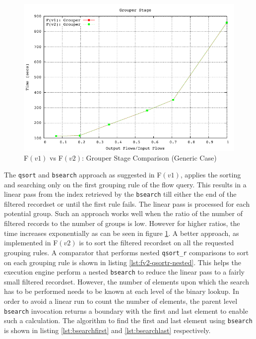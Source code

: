 \begin{figure}[h!]
  \begin{center}
    \includegraphics*
    [width=0.8\linewidth]{figures/benchmarks/grouper-fv1-fv2-bsearch}
    \caption{F$(v1)$ vs F$(v2)$: Grouper Stage Comparison (Generic Case)}
    \label{fig:fv1-fv2-grouper-bsearch}
  \end{center}
\end{figure}

The \texttt{qsort} and \texttt{bsearch} approach as suggested in F$(v1)$,
applies the sorting and searching only on the first grouping rule of the flow
query. This results in a linear pass from the index retrieved by the
\texttt{bsearch} till either the end of the filtered recordset or until the
first rule fails. The linear pass is processed for each potential group. Such
an approach works well when  the
ratio of the number of filtered records to the number of groups is low.
However for higher ratios, the time increases exponentially as can be seen in
figure \ref{fig:fv1-fv2-grouper-bsearch}. A better approach, as implemented in
F$(v2)$ is to sort the filtered recordset on all the requested grouping rules.
A comparator that performs nested \texttt{qsort\_r} comparisons to sort on
each grouping rule is shown in listing \ref{lst:fv2-qsortr-nested}. This helps
the execution engine perform a nested \texttt{bsearch} to reduce the linear
pass to a fairly small filtered recordset. However, the number of elements
upon which the search has to be performed needs to be known at each level of
the binary lookup. In order to avoid a linear run to count the number of
elements, the parent level \texttt{bsearch} invocation returns a boundary with
the first and last element to enable such a calculation. The algorithm to find
the first and last element using \texttt{bsearch} is shown in listing
\ref{lst:bsearchfirst} and \ref{lst:bsearchlast} respectively.


